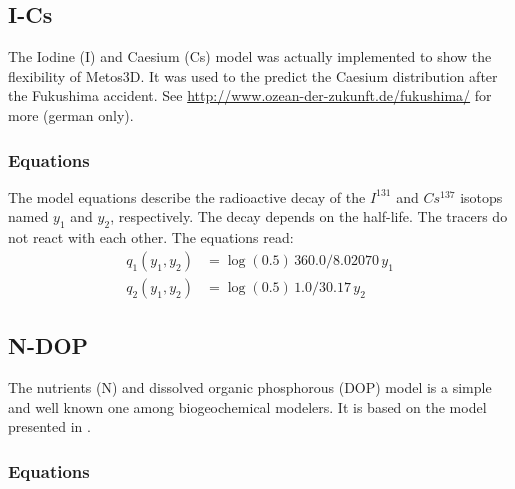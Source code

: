 \documentclass{article}
\begin{document}
%
%
\subsection{I-Cs}

The Iodine (I) and Caesium (Cs) model was actually implemented to show the flexibility of Metos3D.
It was used to the predict the Caesium distribution after the Fukushima accident.
See \href{http://www.ozean-der-zukunft.de/fukushima/}{http://www.ozean-der-zukunft.de/fukushima/}
for more (german only).

%
%
\subsubsection{Equations}

The model equations describe the radioactive decay of the $I^{131}$ and $Cs^{137}$
isotops named $y_1$ and $y_2$, respectively. The decay depends on the
half-life. The tracers do not react with each other. The equations read:
\begin{align*}
q_1(y_1, y_2)	& = \log(0.5) \, 360.0 / 8.02070 \, y_1 \\
q_2(y_1, y_2)	& = \log(0.5) \, 1.0 / 30.17 \, y_2
\end{align*}

%
%
\subsection{N-DOP}

The nutrients (N) and dissolved organic phosphorous (DOP) model is a simple and
well known one among biogeochemical modelers. It is based on the model presented
in \cite{PaFoBo05}.

%
%
\subsubsection{Equations}
\end{document}
